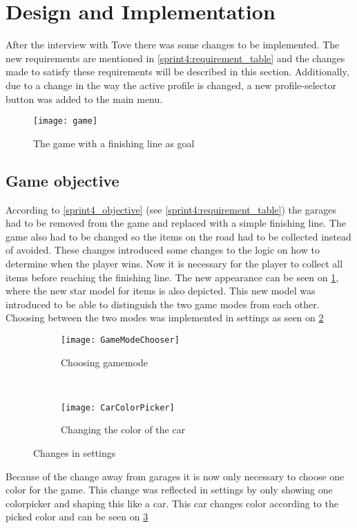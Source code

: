 \section{Design and Implementation}
After the interview with Tove there was some changes to be implemented.
The new requirements are mentioned in \cref{sprint4:requirement_table} and the changes made to satisfy these requirements will be described in this section.
Additionally, due to a change in the way the active profile is changed, a new profile-selector button was added to the main menu.

\begin{figure}
\texttt{[image: game]}
\caption{The game with a finishing line as goal}
\label{game_with_finishing_line}
\end{figure}

\subsection{Game objective}\label{s4_gameobjective}
According to \cref{sprint4_objective} (see \cref{sprint4:requirement_table}) the garages had to be removed from the game and replaced with a simple finishing line.
The game also had to be changed so the items on the road had to be collected instead of avoided.
These changes introduced some changes to the logic on how to determine when the player wins.
Now it is necessary for the player to collect all items before reaching the finishing line. 
The new appearance can be seen on \cref{game_with_finishing_line}, where the new star model for items is also depicted.
This new model was introduced to be able to distinguish the two game modes from each other.
Choosing between the two modes was implemented in settings as seen on \cref{gamemode}


\begin{figure}
\begin{subfigure}{0.5\textwidth}
\centering
\texttt{[image: GameModeChooser]}
\caption{Choosing gamemode}
\label{gamemode}
\end{subfigure}
~
\begin{subfigure}{0.5\textwidth}
\centering
\texttt{[image: CarColorPicker]}
\caption{Changing the color of the car}
\label{carcolor}
\end{subfigure}
\caption{Changes in settings}
\label{Settings}
\end{figure}

Because of the change away from garages it is now only necessary to choose one color for the game. 
This change was reflected in settings by only showing one colorpicker and shaping this like a car.
This car changes color according to the picked color and can be seen on \cref{carcolor}

